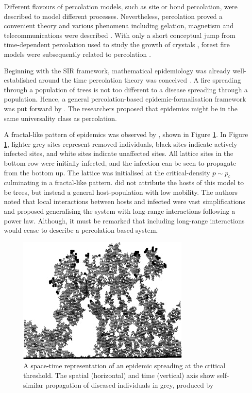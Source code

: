 Different flavours of percolation models, such as site or bond percolation, were described
to model different processes. Nevertheless, percolation proved a convenient theory and various phenomena including gelation, 
magnetism and telecommunications were described \cite{trove.nla.gov.au/work/26493727}. 
With only a short conceptual jump from time-dependent percolation used to study the growth of crystals \cite{Family_1985},
forest fire models were subsequently related to percolation \cite{MacKay_1984}.

Beginning with the SIR framework, mathematical epidemiology was already well-established
around the time percolation theory was conceived \cite{baily1975mathematical}. 
A fire spreading through a population of trees is not too different to a disease spreading through 
a population. Hence, a general percolation-based epidemic-formalisation framework was put forward by
\cite{pub.1059067807}. The researchers proposed that epidemics might be in the same universality class
as percolation.

A fractal-like pattern of epidemics was observed by \cite{GRASSBERGER1986273}, shown in Figure \ref{fig:1d_perc_basis}. 
In Figure \ref{fig:1d_perc_basis}, lighter grey sites represent removed individuals, 
black sites indicate actively infected sites, and white sites indicate unaffected sites. 
All lattice sites in the bottom row were initially infected, and the infection can be seen to propagate
from the bottom up. The lattice was initialised at the critical-density $p\sim p_c$ culminating in a fractal-like pattern.
\cite{GRASSBERGER1986273} did not attribute the hosts of this model to be trees, but instead a general host-population with low mobility. 
The authors noted that local interactions between hosts and infected were vast simplifications and proposed 
generalising the system with long-range interactions following a power law. 
Although, it must be remarked that including long-range interactions would cease to describe a percolation based system.

\begin{figure}
    \centering
    \includegraphics{chapter2/figures/perc1.jpg}
    \caption{A space-time representation of an epidemic spreading at the critical threshold. 
    The spatial (horizontal) and time (vertical) axis show self-similar propagation of diseased 
    individuals in grey, produced by \cite{GRASSBERGER1986273}}
    \label{fig:1d_perc_basis}
\end{figure}

